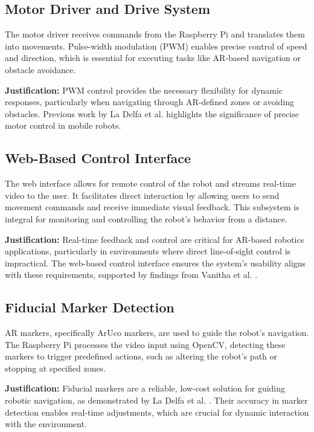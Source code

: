 \subsection{\label{subsec:motor} Motor Driver and Drive System}
The motor driver receives commands from the Raspberry Pi and translates them into movements. Pulse-width modulation (PWM) enables precise control of speed and direction, which is essential for executing tasks like AR-based navigation or obstacle avoidance.

\textbf{Justification:} PWM control provides the necessary flexibility for dynamic responses, particularly when navigating through AR-defined zones or avoiding obstacles. Previous work by La Delfa et al. \cite{delfa2015} highlights the significance of precise motor control in mobile robots.

\subsection{\label{subsec:web_interface} Web-Based Control Interface}
The web interface allows for remote control of the robot and streams real-time video to the user. It facilitates direct interaction by allowing users to send movement commands and receive immediate visual feedback. This subsystem is integral for monitoring and controlling the robot's behavior from a distance.

\textbf{Justification:} Real-time feedback and control are critical for AR-based robotics applications, particularly in environments where direct line-of-sight control is impractical. The web-based control interface ensures the system's usability aligns with these requirements, supported by findings from Vanitha et al. \cite{vanitha2016}.

\subsection{\label{subsec:marker_detection} Fiducial Marker Detection}
AR markers, specifically ArUco markers, are used to guide the robot’s navigation. The Raspberry Pi processes the video input using OpenCV, detecting these markers to trigger predefined actions, such as altering the robot’s path or stopping at specified zones.

\textbf{Justification:} Fiducial markers are a reliable, low-cost solution for guiding robotic navigation, as demonstrated by La Delfa et al. \cite{delfa2015}. Their accuracy in marker detection enables real-time adjustments, which are crucial for dynamic interaction with the environment.

